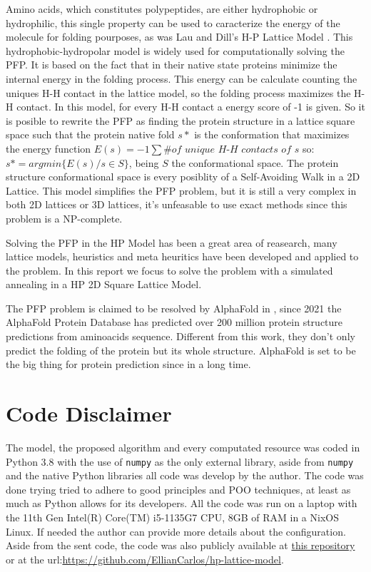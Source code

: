 \documentclass[10pt]{article}
\begin{document}
Amino acids, which constitutes polypeptides, are either hydrophobic or hydrophilic, this single property can be used to caracterize the energy of the molecule for folding pourposes, as was  Lau and Dill's H-P Lattice Model \cite{DillAndLau1989}. This hydrophobic-hydropolar model is widely used for computationally solving the PFP. It is based on the fact that in their native state proteins minimize the internal energy in the folding process. This energy can be calculate counting the  uniques H-H contact in the lattice model, so the folding process maximizes the H-H contact. In this model, for every H-H contact a energy score of -1 is given. So it is posible to rewrite the PFP as finding the protein structure in a lattice square space such that the protein native fold $s*$ is the conformation that maximizes the energy function $E(s) = -1 \sum{\textit{\# of unique H-H contacts of s}}$ so: $s* = argmin\{E(s)/s \in S\}$, being $S$ the conformational space. The protein structure conformational space is every posiblity of a Self-Avoiding Walk in a 2D Lattice. This model simplifies the PFP problem, but it is still a very complex in both 2D lattices or 3D lattices, it's unfeasable to use exact methods since this problem is a NP-complete.

Solving the PFP in the HP Model has been a great area of reasearch, many lattice models, heuristics and meta heuritics have been developed and applied to the problem. In this report we focus to solve the problem with a simulated annealing in a HP 2D Square Lattice Model. 

The PFP problem is claimed to be resolved by AlphaFold in \cite{AlphaFold}, since 2021 the AlphaFold Protein Database has predicted over 200 million protein structure predictions from aminoacids sequence. Different from this work, they don't only predict the folding of the protein but its whole structure. AlphaFold is set to be the big thing for protein prediction since in a long time. 

\section{Code Disclaimer}

The model, the proposed algorithm and every computated resource was coded in Python 3.8 with the use of \verb|numpy| as the only external library, aside from \verb|numpy| and the native Python libraries all code was develop by the author. The code was done trying tried to adhere to good principles and POO techniques, at least as much as Python allows for its developers. All the code was run on a laptop with the 11th Gen Intel(R) Core(TM) i5-1135G7 CPU, 8GB of RAM in a NixOS Linux. If needed the author can provide more details about the configuration. Aside from the sent code, the code was also publicly available at \href{https://github.com/EllianCarlos/hp-lattice-model}{this repository} or at the url:\url{https://github.com/EllianCarlos/hp-lattice-model}.
\end{document}
